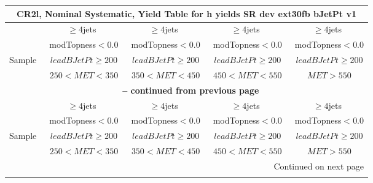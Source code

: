 \documentclass{article}
\begin{document}
 
 
 
 
\begin{longtable}{|l|c|c|c|c|} 
 
\multicolumn{5}{c}{ CR2l, Nominal Systematic, Yield Table for h yields SR dev ext30fb bJetPt v1 }\\* \hline 
  & $\ge4$jets  & $\ge4$jets  & $\ge4$jets  & $\ge4$jets \\* 
  & ~modTopness$<0.0$  & ~modTopness$<0.0$  & ~modTopness$<0.0$  & ~modTopness$<0.0$ \\* 
Sample  & ~$leadBJetPt\ge200$  & ~$leadBJetPt\ge200$  & ~$leadBJetPt\ge200$  & ~$leadBJetPt\ge200$ \\* 
  & ~$250<MET<350$  & ~$350<MET<450$  & ~$450<MET<550$  & ~$MET>550$ \\* 
\hline \hline 
\endfirsthead 
 
\multicolumn{5}{c}{{\bfseries \tablename\ \thetable{} -- continued from previous page}}\\* \hline 
  & $\ge4$jets  & $\ge4$jets  & $\ge4$jets  & $\ge4$jets \\* 
  & ~modTopness$<0.0$  & ~modTopness$<0.0$  & ~modTopness$<0.0$  & ~modTopness$<0.0$ \\* 
Sample  & ~$leadBJetPt\ge200$  & ~$leadBJetPt\ge200$  & ~$leadBJetPt\ge200$  & ~$leadBJetPt\ge200$ \\* 
  & ~$250<MET<350$  & ~$350<MET<450$  & ~$450<MET<550$  & ~$MET>550$ \\* 
\hline \hline 
\endhead 
 
\multicolumn{5}{|r|}{{Continued on next page}}\\* \hline 
\endfoot 
 
 
\endlastfoot 
 

\end{longtable}
\end{document}
